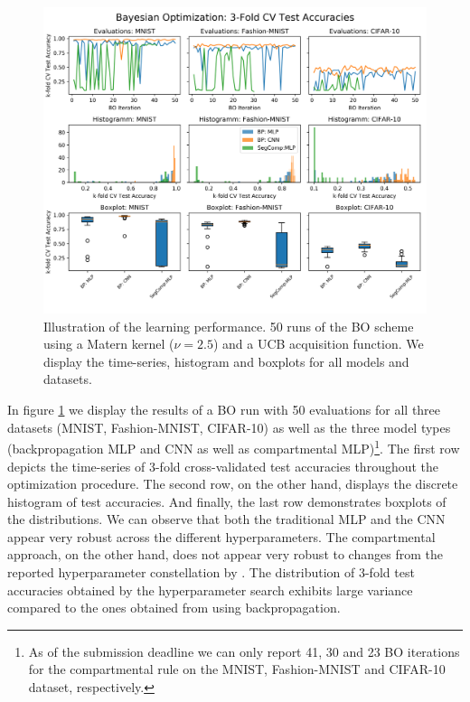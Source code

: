 \documentclass[colorinlistoftodos]{article}
\theoremstyle{definition}
\begin{document}
\begin{figure}[H]
	\centering
	\includegraphics[width=\textwidth]{../figures/bayes_opt_comparison}
	\caption{Illustration of the learning performance. 50 runs of the BO scheme using a Matern kernel ($\nu=2.5$) and a UCB acquisition function. We display the time-series, histogram and boxplots for all models and datasets.}\label{fig:bo}
\end{figure}

In figure \ref{fig:bo} we display the results of a BO run with 50 evaluations for all three datasets (MNIST, Fashion-MNIST, CIFAR-10) as well as the three model types (backpropagation MLP and CNN as well as compartmental MLP)\footnote{As of the submission deadline we can only report 41, 30 and 23 BO iterations for the compartmental rule on the MNIST, Fashion-MNIST and CIFAR-10 dataset, respectively.}. The first row depicts the time-series of 3-fold cross-validated test accuracies throughout the optimization procedure. The second row, on the other hand, displays the discrete histogram of test accuracies. And finally, the last row demonstrates boxplots of the distributions. We can observe that both the traditional MLP and the CNN appear very robust across the different hyperparameters. The compartmental approach, on the other hand, does not appear very robust to changes from the reported hyperparameter constellation by \citet{guerguiev2017}. The distribution of 3-fold test accuracies obtained by the hyperparameter search exhibits large variance compared to the ones obtained from using backpropagation. 
\end{document}
